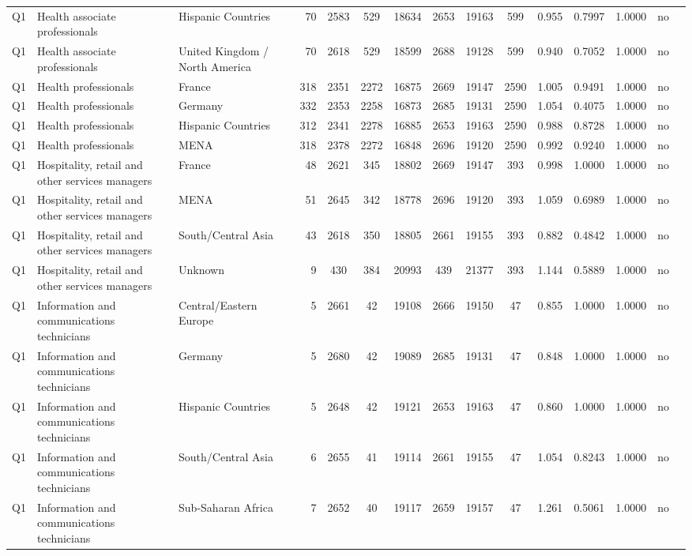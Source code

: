 \begin{longtable}{lllrcccccccccll}
Q1 & Health associate professionals & Hispanic Countries & 70 & 2583 & 529 & 18634 & 2653 & 19163 & 599 & 0.955 & 0.7997 & 1.0000 & no \\
Q1 & Health associate professionals & United Kingdom / North America & 70 & 2618 & 529 & 18599 & 2688 & 19128 & 599 & 0.940 & 0.7052 & 1.0000 & no \\
Q1 & Health professionals & France & 318 & 2351 & 2272 & 16875 & 2669 & 19147 & 2590 & 1.005 & 0.9491 & 1.0000 & no \\
Q1 & Health professionals & Germany & 332 & 2353 & 2258 & 16873 & 2685 & 19131 & 2590 & 1.054 & 0.4075 & 1.0000 & no \\
Q1 & Health professionals & Hispanic Countries & 312 & 2341 & 2278 & 16885 & 2653 & 19163 & 2590 & 0.988 & 0.8728 & 1.0000 & no \\
Q1 & Health professionals & MENA & 318 & 2378 & 2272 & 16848 & 2696 & 19120 & 2590 & 0.992 & 0.9240 & 1.0000 & no \\
Q1 & Hospitality, retail and other services managers & France & 48 & 2621 & 345 & 18802 & 2669 & 19147 & 393 & 0.998 & 1.0000 & 1.0000 & no \\
Q1 & Hospitality, retail and other services managers & MENA & 51 & 2645 & 342 & 18778 & 2696 & 19120 & 393 & 1.059 & 0.6989 & 1.0000 & no \\
Q1 & Hospitality, retail and other services managers & South/Central Asia & 43 & 2618 & 350 & 18805 & 2661 & 19155 & 393 & 0.882 & 0.4842 & 1.0000 & no \\
Q1 & Hospitality, retail and other services managers & Unknown & 9 & 430 & 384 & 20993 & 439 & 21377 & 393 & 1.144 & 0.5889 & 1.0000 & no \\
Q1 & Information and communications technicians & Central/Eastern Europe & 5 & 2661 & 42 & 19108 & 2666 & 19150 & 47 & 0.855 & 1.0000 & 1.0000 & no \\
Q1 & Information and communications technicians & Germany & 5 & 2680 & 42 & 19089 & 2685 & 19131 & 47 & 0.848 & 1.0000 & 1.0000 & no \\
Q1 & Information and communications technicians & Hispanic Countries & 5 & 2648 & 42 & 19121 & 2653 & 19163 & 47 & 0.860 & 1.0000 & 1.0000 & no \\
Q1 & Information and communications technicians & South/Central Asia & 6 & 2655 & 41 & 19114 & 2661 & 19155 & 47 & 1.054 & 0.8243 & 1.0000 & no \\
Q1 & Information and communications technicians & Sub-Saharan Africa & 7 & 2652 & 40 & 19117 & 2659 & 19157 & 47 & 1.261 & 0.5061 & 1.0000 & no \\

\end{longtable}
